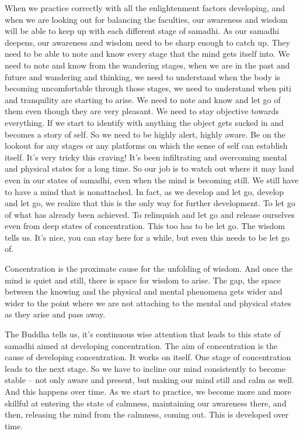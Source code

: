 \documentclass[letterpaper,10pt,english]{sphinxmanual}
\begin{document}
\sphinxAtStartPar
When we practice correctly with all the enlightenment factors developing, and when we are looking out for balancing the faculties, our awareness
and wisdom will be able to keep up with each different stage of samadhi. As
our samadhi deepens, our awareness and wisdom need to be sharp enough to
  catch up. They need to be able to note and know every stage that the mind
gets itself into. We need to note and know from the wandering stages, when
we are in the past and future and wandering and thinking, we need to understand when the body is becoming uncomfortable through those stages, we
need to understand when piti and tranquility are starting to arise. We need
to  note  and  know  and  let  go  of  them  even  though  they  are  very  pleasant.
We  need  to  stay  objective  towards  everything.  If  we  start  to  identify  with
anything the object gets sucked in and becomes a story of self. So we need
to  be  highly  alert,  highly  aware.  Be  on  the  lookout  for  any  stages  or  any
platforms on which the sense of self can establish itself. It’s very tricky this
craving! It’s been infiltrating and overcoming mental and physical states for
a long time. So our job is to watch out where it may land even in our states
of samadhi, even when the mind is becoming still. We still have to have a
mind  that  is  non\sphinxhyphen{}attached.  In  fact,  as  we  develop  and  let  go,  develop  and
let go, we realize that this is the only way for further development. To let
go of what has already been achieved. To relinquish and let go and release
ourselves even from deep states of concentration. This too has to be let go.
The wisdom tells us. It’s nice, you can stay here for a while, but even this
needs to be let go of.

\sphinxAtStartPar
Concentration is the proximate cause for the unfolding of wisdom. And
once the mind is quiet and still, there is space for wisdom to arise. The gap,
the space between the knowing and the physical and mental phenomena gets
wider and wider to the point where we are not attaching to the mental and
physical states as they arise and pass away.

\sphinxAtStartPar
The  Buddha  tells  us,  it’s  continuous  wise  attention  that  leads  to  this
state of samadhi aimed at developing concentration. The aim of concentration is the cause of developing concentration. It works on itself. One stage of
concentration leads to the next stage. So we have to incline our mind consistently to become stable – not only aware and present, but making our mind
still and calm as well. And this happens over time. As we start to practice, we
become more and more skillful at entering the state of calmness, maintaining
our awareness there, and then, releasing the mind from the calmness, coming
out. This is developed over time.
\end{document}
